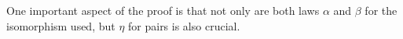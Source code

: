 \documentclass[sigplan,review,anonymous]{acmart}\settopmatter{printfolios=true,printccs=false,printacmref=false}
\begin{document}
\begin{code}
\AgdaSpace{}%
\AgdaSymbol{=}\AgdaSpace{}%
\AgdaSpace{}%
\AgdaSymbol{\{}\AgdaSpace{}%
\AgdaSymbol{(}\AgdaSpace{}%
\AgdaOperator{\AgdaInductiveConstructor{,}}\AgdaSpace{}%
\AgdaSymbol{)}\AgdaSpace{}%
\AgdaSpace{}%
\AgdaSymbol{(}\AgdaSpace{}%
\AgdaSpace{}%
\AgdaSymbol{(}\AgdaSpace{}%
\AgdaSymbol{\AgdaUnderscore{}))}\AgdaSpace{}%
\AgdaOperator{\AgdaInductiveConstructor{,}}\AgdaSpace{}%
\AgdaSpace{}%
\AgdaSpace{}%
\AgdaSymbol{(}\AgdaSpace{}%
\AgdaSymbol{\AgdaUnderscore{})\}}\<%
\\
%
\>[4]\AgdaSymbol{\}}\<%
\\
%
\>[2]\AgdaSymbol{\})}\<%
\end{code}

One important aspect of the proof is that not only are both laws $\alpha$ and $\beta$
for the isomorphism used, but $\eta$ for pairs is also crucial.
\end{document}
